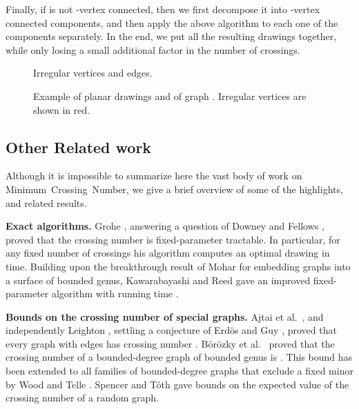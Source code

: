\documentclass[twoside,leqno,twocolumn]{article}
\newcommand{\MCN}{\mbox{\sf Minimum Crossing Number}\xspace}
\begin{document}
Finally, if  is not -vertex  connected, then we first decompose it into -vertex connected components, and then apply the above algorithm to each one of the components separately. In the end, we put all the resulting drawings together, while only losing a small additional factor in the number of crossings.


\begin{figure}[h]
\centering
{}
\hspace{2cm}
\caption{Irregular vertices and edges.}
\end{figure}


\begin{figure}[h]
\begin{center}
 \caption{Example of planar drawings  and  of graph . Irregular vertices are shown in red.}\label{fig: example2}
\end{center}
\end{figure}



\subsection{Other Related work}
Although it is impossible to summarize here the vast body of work on \MCN, we give a brief overview of some of the highlights, and related results.

\textbf{Exact algorithms.}
Grohe \cite{Grohe04}, answering a question of Downey and Fellows \cite{fpt}, proved that the crossing number is fixed-parameter tractable.
In particular, for any fixed number of crossings his algorithm computes an optimal drawing in  time.
Building upon the breakthrough result of Mohar \cite{Mohar99} for embedding graphs into a surface of bounded genus, Kawarabayashi and Reed \cite{KawarabayashiR07} gave an improved fixed-parameter algorithm with running time .

\textbf{Bounds on the crossing number of special graphs.}
Ajtai et al.~\cite{ajtai82}, and independently Leighton \cite{leighton_book}, settling a conjecture of Erd\"{o}s and Guy \cite{erdos_guy73}, proved that every graph with  edges has crossing number .
B\"{o}r\"{o}zky et al.~\cite{BorozkyPT06} proved that 
the crossing number of a bounded-degree graph of bounded genus is .
This bound has been extended to all families of bounded-degree graphs that exclude a fixed minor by Wood and Telle \cite{WoodT06}.
Spencer and T\'{o}th \cite{spencer_random} gave bounds on the expected value of the crossing number of a random graph.
\end{document}
